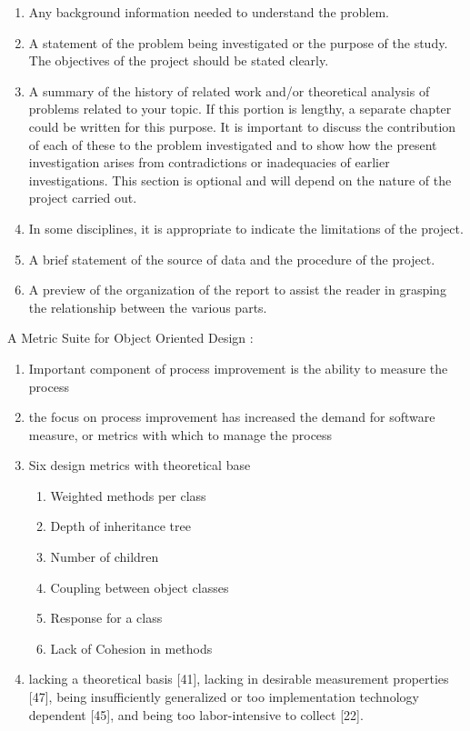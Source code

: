 \begin{enumerate}
    \item Any background information needed to understand the problem. 
    \item A statement of the problem being investigated or the purpose of the study. The objectives of the project should be stated clearly.
    \item A summary of the history of related work and/or theoretical analysis of problems related to your topic. If this portion is lengthy, a separate chapter could be written for this purpose. It is important to discuss the contribution of each of these to the problem investigated and to show how the present investigation arises from contradictions or inadequacies of earlier investigations. This section is optional and will depend on the nature of the project carried out.
    \item In some disciplines, it is appropriate to indicate the limitations of the project.
    \item A brief statement of the source of data and the procedure of the project.
    \item A preview of the organization of the report to assist the reader in grasping the relationship between the various parts.
\end{enumerate}



\noindent A Metric Suite for Object Oriented Design \cite{chidamber1994metrics}:

\begin{enumerate}
    \item Important component of process improvement is the ability to measure the process
    \item the focus on process improvement has increased the demand for software measure, or metrics with which to manage the process
    \item Six design metrics with theoretical base
    \begin{enumerate}
        \item Weighted methods per class
        \item Depth of inheritance tree
        \item Number of children
        \item Coupling between object classes
        \item Response for a class
        \item Lack of Cohesion in methods
    \end{enumerate}
    \item lacking a theoretical basis [41], lacking in desirable measurement properties [47], being insufficiently generalized or too implementation technology dependent [45], and being too labor-intensive to collect [22].
\end{enumerate}

